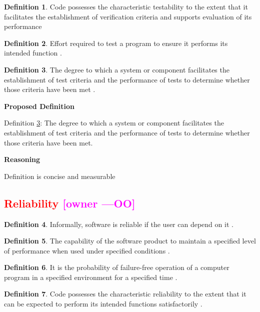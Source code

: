 \documentclass[letterpaper,cleveref]{lipics-v2019}
\newcommand{\authornote}[3]{\textcolor{#1}{[#3 ---#2]}}
\newcommand{\authornote}[3]{}
\newcommand{\oo}[1]{\authornote{magenta}{OO}{#1}} %
\newcommand{\notdone}[1]{\textcolor{red}{#1}}
\theoremstyle{definition}
\newtheorem{defn}{Definition}
\begin{document}
\begin{defn}
	Code possesses the characteristic testability to the extent that it
    facilitates the establishment of verification criteria and supports
    evaluation of its performance \citep{boehm1976quantitative}
\end{defn}

\begin{defn}
	Effort required to test a program to ensure it performs
	its intended function \citep{McCallEtAl1977}.
\end{defn}

\begin{defn} \label{Defn_Testability}
	 The degree to which a system or component facilitates the establishment of
	 test criteria and the performance of tests to determine whether those
	 criteria have been met \citep{IEEEStdGlossarySET1990}.
\end{defn}

\noindent \textbf{Proposed Definition}

Definition \ref{Defn_Testability}: The degree to which a system or component
 facilitates the establishment of test criteria and the performance of tests
 to determine whether those criteria have been met.

\noindent \textbf{Reasoning}

Definition is concise and measurable

\subsection{\notdone{Reliability} \oo{owner}}

\begin{defn}
  Informally, software is reliable if the user can depend on it \citep{GhezziEtAl2003}.
\end{defn}

\begin{defn}
 The capability of the software product to maintain a specified level of performance when used under specified conditions \cite{ISO9126}.
\end{defn}
\begin{defn} \label{reliabilitySelected1} It is the probability of failure-free
  operation of a computer program in a specified environment for a specified
  time \citep{musa1987software}.
\end{defn} 
    
\begin{defn}
  Code possesses the characteristic reliability to the extent that it can be
  expected to perform its intended functions satisfactorily
  \citep{boehm1976quantitative}.
\end{defn}
\end{document}
